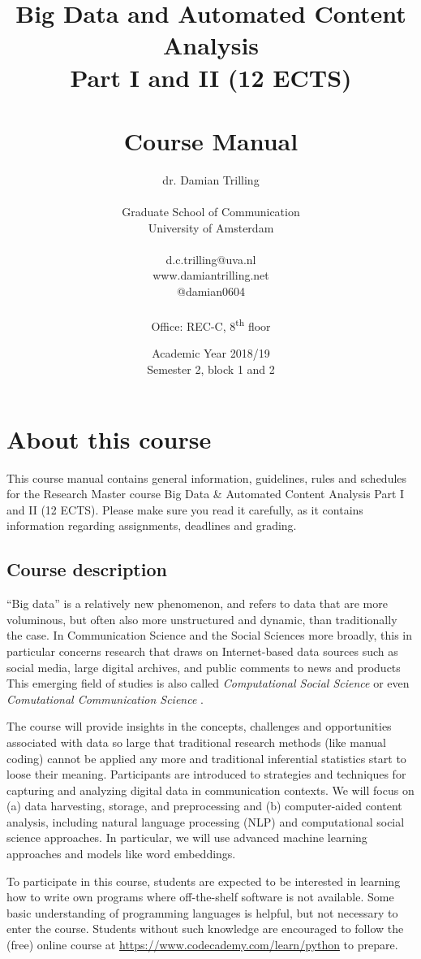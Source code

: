 \documentclass[a4paper,10pt]{report}
\title{Big Data and Automated Content Analysis\\ Part I and II (12 ECTS)\\~\\Course Manual}
\author{dr. Damian Trilling\\~\\Graduate School of Communication\\University of Amsterdam\\~\\d.c.trilling@uva.nl\\www.damiantrilling.net\\@damian0604\\~\\Office: REC-C, 8\textsuperscript{th} floor}
\date{Academic Year 2018/19\\Semester 2, block 1 and 2}
\begin{document}
\maketitle



\chapter{About this course}

This course manual contains general information, guidelines, rules and schedules for the Research Master course Big Data \& Automated Content Analysis Part I and II (12 ECTS). Please make sure you read it carefully, as it  contains information regarding assignments, deadlines and grading.

\section{Course description}
 
``Big data'' is a relatively new phenomenon, and refers to data that are more voluminous, but often also more unstructured and dynamic, than traditionally the case. In Communication Science and the Social Sciences more broadly, this in particular concerns research that draws on Internet-based data sources such as social media, large digital archives, and public comments to news and products This emerging field of studies is also called \emph{Computational Social Science} \citep{Lazer2009} or even \emph{Comutational Communication Science} \citep{Shah2015}.


The course will provide insights in the concepts, challenges and opportunities associated with data so large that traditional research methods (like manual coding) cannot be applied any more and traditional inferential statistics start to loose their meaning. Participants are introduced to strategies and techniques for capturing and analyzing digital data in communication contexts. We will focus on (a) data harvesting, storage, and preprocessing and (b) computer-aided content analysis, including natural language processing (NLP) and computational social science approaches. In particular, we will use advanced machine learning approaches and models like word embeddings.

To participate in this course, students are expected to be interested in learning how to write own programs where off-the-shelf software is not available. Some basic understanding of programming languages is helpful, but not necessary to enter the course. Students without such knowledge are encouraged to follow the (free) online course at \url{https://www.codecademy.com/learn/python} to prepare.
\end{document}
